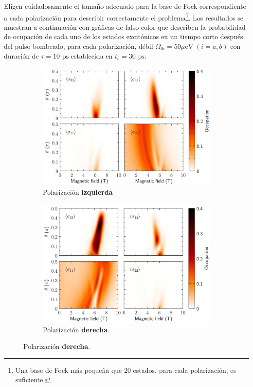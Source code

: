 \documentclass[main.tex]{subfiles}
\begin{document}
Eligen cuidadosamente el tamaño adecuado para la base de Fock correspondiente a cada polarización para describir correctamente el problema\footnote{Una base de Fock más pequeña que 20 estados, para cada polarización, es suficiente.}. Los resultados se muestran a continuación con gráficas de falso color que describen la probabilidad de ocupación de cada uno de los estados excitónicos en un tiempo corto después del pulso bombeado, para cada polarización, débil $\Omega_{0i}= 50\text{$\mu$eV}\; (i=a,b)$ con duración de $\tau=10\text{ ps}$ establecida en $t_c = 30\text{ ps}$:

\begin{figure}
	\centering
	
	\begin{subfigure}{0.49\textwidth}
		\centering
		\includegraphics[width=\linewidth]{img/populationMagneticLeft}
		\caption{Polarización \textbf{izquierda}}
		\label{fig:populationmagneticleft}
	\end{subfigure}
	\hfill
	\begin{subfigure}{0.49\textwidth}
		\centering
		\includegraphics[width=\linewidth]{img/populationMagneticRight}
		\caption{Polarización \textbf{derecha}.}
		\label{fig:populationmagneticright}
	\end{subfigure}
	

\end{figure}
\end{document}
